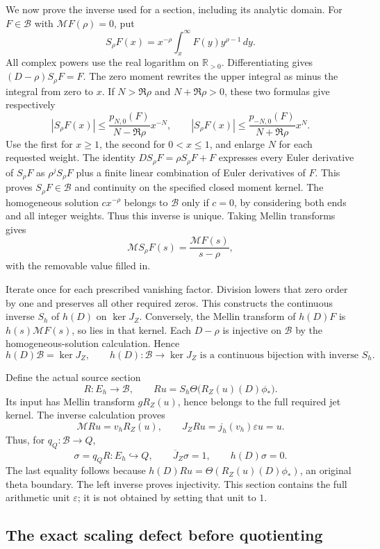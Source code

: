 We now prove the inverse used for a section, including
its analytic domain. For \(F\in\mathscr B\) with
\(\mathcal MF(\rho)=0\), put
\[
S_\rho F(x)=x^{-\rho}
\int_x^\infty F(y)y^{\rho-1}\,dy.
\]
All complex powers use the real logarithm on
\(\mathbb R_{>0}\). Differentiating gives
\((D-\rho)S_\rho F=F\). The zero moment rewrites
the upper integral as minus the integral from zero
to \(x\). If \(N>\Re\rho\) and \(N+\Re\rho>0\),
these two formulas give respectively
\[
|S_\rho F(x)|\le
\frac{p_{N,0}(F)}{N-\Re\rho}x^{-N},
\qquad
|S_\rho F(x)|\le
\frac{p_{-N,0}(F)}{N+\Re\rho}x^N.
\]
Use the first for \(x\ge1\), the second for
\(0<x\le1\), and enlarge \(N\) for each requested
weight. The identity \(DS_\rho F=\rho S_\rho F+F\)
expresses every Euler derivative of \(S_\rho F\)
as \(\rho^jS_\rho F\) plus a finite linear
combination of Euler derivatives of \(F\).
This proves \(S_\rho F\in\mathscr B\) and
continuity on the specified closed moment kernel.
The homogeneous solution \(cx^{-\rho}\) belongs
to \(\mathscr B\) only if \(c=0\), by considering
both ends and all integer weights. Thus this
inverse is unique. Taking Mellin transforms gives
\[
\mathcal MS_\rho F(s)=\frac{\mathcal MF(s)}{s-\rho},
\]
with the removable value filled in.

Iterate once for each prescribed vanishing factor.
Division lowers that zero order by one and preserves
all other required zeros. This constructs the
continuous inverse \(S_h\) of \(h(D)\) on
\(\ker J_Z\). Conversely, the Mellin transform of
\(h(D)F\) is \(h(s)\mathcal MF(s)\), so lies in that
kernel. Each \(D-\rho\) is injective on \(\mathscr B\)
by the homogeneous-solution calculation. Hence
\[
h(D)\mathscr B=\ker J_Z,\qquad
h(D):\mathscr B\longrightarrow\ker J_Z
\text{ is a continuous bijection with inverse }S_h.
\]

Define the actual source section
\[
R:E_h\longrightarrow\mathscr B,\qquad
Ru=S_h\Theta\bigl(R_Z(u)(D)\phi_*\bigr).
\]
Its input has Mellin transform \(gR_Z(u)\), hence
belongs to the full required jet kernel. The
inverse calculation proves
\[
\mathcal MRu=v_hR_Z(u),\qquad
J_ZRu=j_h(v_h)\varepsilon u=u.
\]
Thus, for \(q_Q:\mathscr B\to Q\),
\[
\sigma=q_QR:E_h\hookrightarrow Q,\qquad
\overline J_Z\sigma=1,\qquad h(D)\sigma=0.
\]
The last equality follows because
\(h(D)Ru=\Theta(R_Z(u)(D)\phi_*)\), an original
theta boundary. The left inverse proves injectivity.
This section contains the full arithmetic unit
\(\varepsilon\); it is not obtained by setting
that unit to \(1\).

\subsection{The exact scaling defect before quotienting}
\label{app:scaling-defect}


